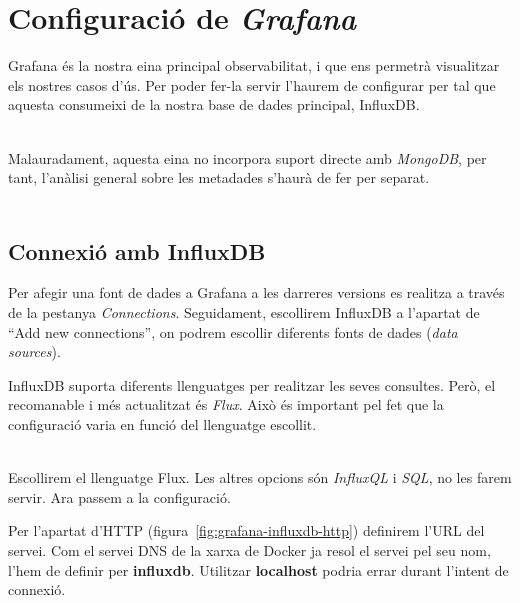 \chapter{Configuració de \textit{Grafana}}\label{ch:grafana-config}

Grafana és la nostra eina principal observabilitat, i que ens permetrà visualitzar els nostres casos d'ús.
Per poder fer-la servir l'haurem de configurar per tal que aquesta consumeixi de la nostra base de dades principal, InfluxDB.

\noindent \\
Malauradament, aquesta eina no incorpora suport directe amb \textit{MongoDB}, per tant, l'anàlisi general sobre les metadades s'haurà de fer per separat. \\ \\

\section*{Connexió amb InfluxDB}\label{sec:influxdb-grafana-connection}

\noindent
Per afegir una font de dades a Grafana a les darreres versions es realitza a través de la pestanya \textit{Connections}.
Seguidament,  escollirem InfluxDB a l'apartat de ``Add new connections'', on podrem escollir diferents fonts de dades (\textit{data sources}). \\

\noindent
\begin{tcolorbox}[colback=blue!5!white, colframe=blue!75!black, title=Llenguatge de cerca]
    InfluxDB suporta diferents llenguatges per realitzar les seves consultes.
    Però, el recomanable i més actualitzat és \textit{Flux}.
    Això és important pel fet que la configuració varia en funció del llenguatge escollit.
\end{tcolorbox}

\noindent \\
Escollirem el llenguatge Flux.
Les altres opcions són \textit{InfluxQL} i \textit{SQL}, no les farem servir.
Ara passem a la configuració.

\clearpage

\noindent
Per l'apartat d'HTTP (figura~\ref{fig:grafana-influxdb-http}) definirem l'\gls{URL} del servei.
Com el servei \gls{DNS} de la xarxa de \gls{Docker} ja resol el servei pel seu nom, l'hem de definir per \textbf{influxdb}.
Utilitzar \textbf{localhost} podria errar durant l'intent de connexió.

